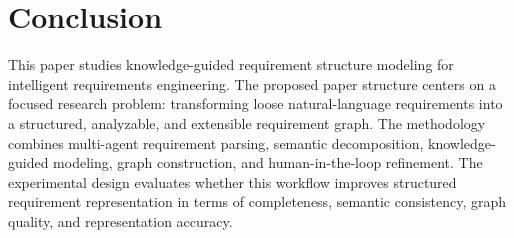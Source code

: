 \section{Conclusion}
\label{conclusion}

This paper studies knowledge-guided requirement structure modeling for intelligent requirements engineering.
The proposed paper structure centers on a focused research problem: transforming loose natural-language requirements into a structured, analyzable, and extensible requirement graph.
The methodology combines multi-agent requirement parsing, semantic decomposition, knowledge-guided modeling, graph construction, and human-in-the-loop refinement.
The experimental design evaluates whether this workflow improves structured requirement representation in terms of completeness, semantic consistency, graph quality, and representation accuracy.

